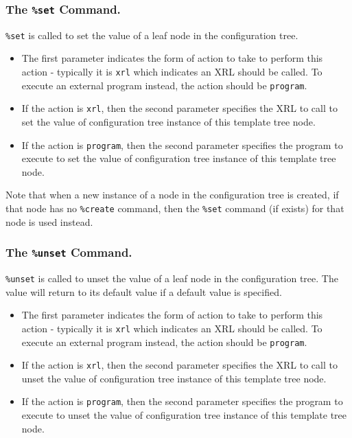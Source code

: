 \documentclass[11pt]{article}
\begin{document}
\subsubsection{The {\tt \%set} Command.}
{\tt \%set} is called to set the value of a leaf node in the
configuration tree.

\begin{itemize}

  \item The first parameter indicates the form of action to take to perform
   this action - typically it is {\tt xrl} which indicates an XRL should
   be called.
   To execute an external program instead, the action should be {\tt program}.

  \item If the action is {\tt xrl}, then the second parameter specifies the
   XRL to call to set the value of configuration tree instance of this template
   tree node.

  \item If the action is {\tt program}, then the second parameter specifies the
   program to execute to set the value of configuration tree instance of this
   template tree node.

\end{itemize}

Note that when a new instance of a node in the configuration tree is created,
if that node has no {\tt \%create} command, then the {\tt \%set}
command (if exists) for that node is used instead.

\subsubsection{The {\tt \%unset} Command.}
{\tt \%unset} is called to unset the value of a leaf node in the
configuration tree.  The value will return to its default value if a
default value is specified.

\begin{itemize}
  \item The first parameter indicates the form of action to take to perform
   this action - typically it is {\tt xrl} which indicates an XRL should
   be called.
   To execute an external program instead, the action should be {\tt program}.

  \item If the action is {\tt xrl}, then the second parameter specifies the
   XRL to call to unset the value of configuration tree instance of this
   template tree node.

  \item If the action is {\tt program}, then the second parameter specifies the
   program to execute to unset the value of configuration tree instance of this
   template tree node.

\end{itemize}
\end{document}
